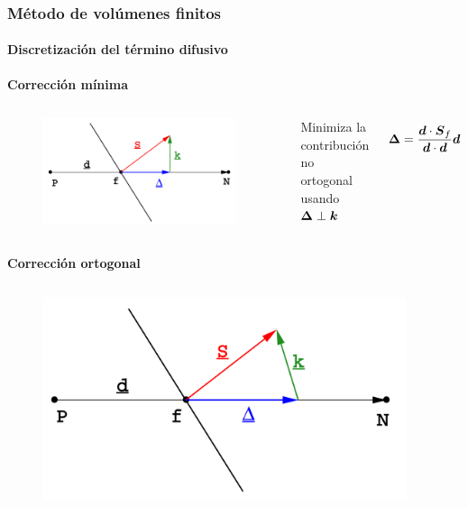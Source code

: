 \begin{frame}
    \frametitle{M\'etodo de vol\'umenes finitos}
    \framesubtitle{Discretizaci\'on del t\'ermino difusivo}

    \textbf{Correcci\'on m\'inima}
    
    \begin{columns}

    \begin{figure}[h]
      \begin{center}
        \includegraphics[width=0.95\textwidth]{Imagenes/CorreccionMinima}
      \end{center}
    \end{figure}


    \begin{center}
      Minimiza la contribuci\'on no ortogonal usando $\boldsymbol{\Delta} \perp \boldsymbol{k}$
    \end{center}

    $$ \boldsymbol{\Delta} = \dfrac{ \boldsymbol{d} \cdot \boldsymbol{S}_f }{\boldsymbol{d} \cdot \boldsymbol{d}} \boldsymbol{d} $$

    \end{columns}
    



    \textbf{Correcci\'on ortogonal}
    
    \begin{columns}

    \begin{figure}[h]
      \begin{center}
        \includegraphics[width=0.95\textwidth]{Imagenes/CorreccionOrtogonal}
      \end{center}
    \end{figure}



\end{columns}
\end{frame}
